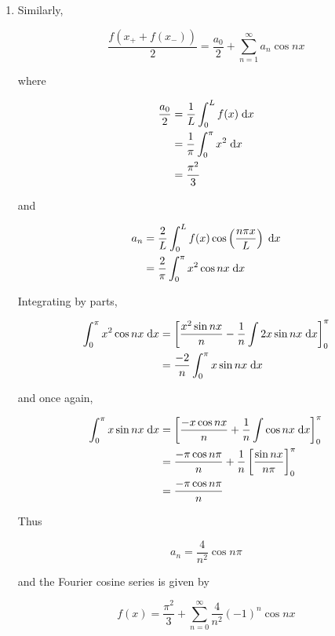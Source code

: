 \documentclass[a4paper]{article}
\begin{document}
\begin{enumerate}[label = (\alph*)]
	\item Similarly,
	
	\[ \frac{f(x_{+} + f(x_{-}))}{2} =  \frac{a_{0}}{2} + \sum_{n=1}^{\infty} a_{n} \cos n x  \]
	
	where 
	
	\begin{align*}
	\frac{a_{0}}{2} & = \frac{1}{L} \int_{0}^{L} f(x) \; \mathrm{d} x \\
	& = \frac{1}{\pi} \int_{0}^{\pi} x^{2} \; \mathrm{d} x\\
	& = \frac{\pi^{2}}{3}
	\end{align*}
	
	and 
	
	\begin{align*}
	a_{n} & = \frac{2}{L} \int_{0}^{L} f(x) \cos \left( \frac{n \pi x}{L} \right) \; \mathrm{d} x  \\
	& = \frac{2}{\pi} \int_{0}^{\pi} x^{2} \cos n x \; \mathrm{d} x
	\end{align*}
	
	Integrating by parts,
	
	
	\begin{align*}
	\int_{0}^{\pi} x^{2} \cos n x \; \mathrm{d} x & = \left[ \frac{x^{2}\sin n x}{n}  - \frac{1}{n}\int 2x \sin n x \; \mathrm{d} x \right]_{0}^{\pi} \\
	& = \frac{-2}{n} \int_{0}^{\pi} x \sin n x \; \mathrm{d} x
	\end{align*}
	
	and once again,
	
	\begin{align*}
	\int_{0}^{\pi} x \sin n x \; \mathrm{d} x & = \left[  \frac{- x \cos n x}{n} + \frac{1}{n} \int \cos n x \; \mathrm{d} x \right]_{0}^{\pi} \\
	& = \frac{- \pi \cos n \pi}{n} + \frac{1}{n} \left[ \frac{\sin n x}{n \pi} \right]_{0}^{\pi} \\
	& = \frac{- \pi \cos n \pi}{n}
	\end{align*}
	
	Thus
	
	\[ a_{n} = \frac{4}{n^{2}} \cos n \pi  \]
	
	and the Fourier cosine series is given by
	
	\[ f(x) = \frac{\pi^{2}}{3} + \sum_{n=0}^{\infty} \frac{4}{n^{2}} (-1)^{n} \cos n x \]
	
\end{enumerate}
\end{document}
